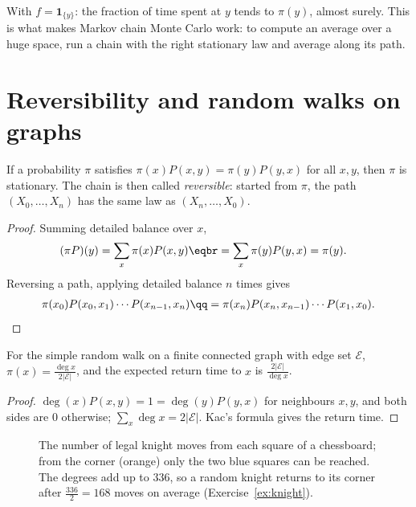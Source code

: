 With $f=\mathbf 1_{\{y\}}$: the fraction of time spent at $y$ tends to $\pi(y)$, almost surely. This is what makes Markov chain Monte Carlo work: to
compute an average over a huge space, run a chain with the right stationary law and average along its path.

\section{Reversibility and random walks on graphs}\label{sec:reversible}

\begin{proposition}\label{prop:detailed}
If a probability $\pi$ satisfies $\pi(x)P(x,y)=\pi(y)P(y,x)$ for all $x,y$, then $\pi$ is stationary. The chain is then called \emph{reversible}:
started from $\pi$, the path $(X_0,\dots,X_n)$ has the same law as $(X_n,\dots,X_0)$.
\end{proposition}
\begin{proof}
Summing detailed balance over $x$,
\[
\begin{aligned}(\pi P)(y)&=\sum_x\pi(x)P(x,y)\eqbr=\sum_x\pi(y)P(y,x)=\pi(y).\end{aligned}
\]
Reversing a path, applying detailed balance $n$ times gives
\[
\begin{gathered}\pi(x_0)P(x_0,x_1)\cdots P(x_{n-1},x_n)\qq=\pi(x_n)P(x_n,x_{n-1})\cdots P(x_1,x_0).\end{gathered}
\]
\end{proof}

\begin{corollary}\label{cor:graph}
For the simple random walk on a finite connected graph with edge set $\mathcal E$, $\pi(x)=\frac{\deg x}{2|\mathcal E|}$, and the expected return time to $x$ is $\frac{2|\mathcal E|}{\deg x}$.
\end{corollary}
\begin{proof}
$\deg(x)P(x,y)=1=\deg(y)P(y,x)$ for neighbours $x,y$, and both sides are $0$ otherwise; $\sum_x\deg x=2|\mathcal E|$. Kac's formula gives the return time.
\end{proof}

\begin{figure}[ht]
\centering
{}
\caption{The number of legal knight moves from each square of a chessboard; from the corner (orange) only the two blue squares can be reached. The degrees add up to $336$, so a random
knight returns to its corner after $\frac{336}2=168$ moves on average (Exercise~\ref{ex:knight}).}
\label{fig:knight}
\end{figure}

